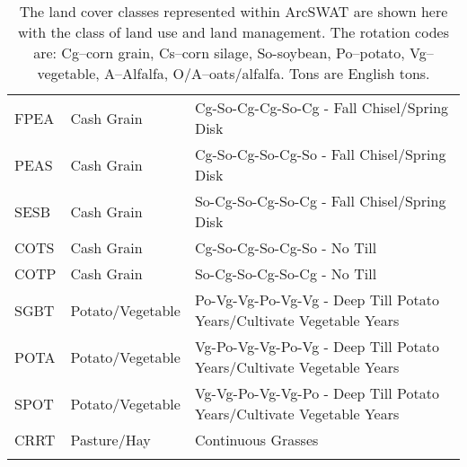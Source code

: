 \begin{longtable}{lll}
  FPEA & Cash Grain & Cg-So-Cg-Cg-So-Cg - Fall Chisel/Spring Disk \\ 
  PEAS & Cash Grain & Cg-So-Cg-So-Cg-So - Fall Chisel/Spring Disk \\ 
  SESB & Cash Grain & So-Cg-So-Cg-So-Cg - Fall Chisel/Spring Disk \\ 
  COTS & Cash Grain & Cg-So-Cg-So-Cg-So - No Till \\ 
  COTP & Cash Grain & So-Cg-So-Cg-So-Cg - No Till \\ 
  SGBT & Potato/Vegetable & Po-Vg-Vg-Po-Vg-Vg - Deep Till Potato Years/Cultivate Vegetable Years \\ 
  POTA & Potato/Vegetable & Vg-Po-Vg-Vg-Po-Vg - Deep Till Potato Years/Cultivate Vegetable Years \\ 
  SPOT & Potato/Vegetable & Vg-Vg-Po-Vg-Vg-Po - Deep Till Potato Years/Cultivate Vegetable Years \\ 
  CRRT & Pasture/Hay & Continuous Grasses \\ 
   \hline
\hline
\caption{The land cover classes represented within ArcSWAT are shown here with the class of land use and land management. The rotation codes are: Cg--corn grain, Cs--corn silage, So-soybean, Po--potato, Vg--vegetable, A--Alfalfa, O/A--oats/alfalfa. Tons are English tons.} 
\label{tab:lnd_mgt_def}
\end{longtable}
